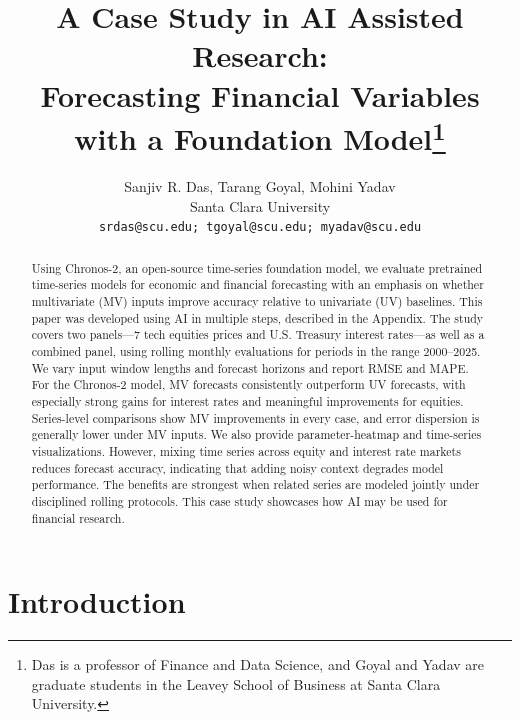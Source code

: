 \documentclass[twocolumn]{article}
\begin{document}
\title{A Case Study in AI Assisted Research: \\ Forecasting Financial Variables with a Foundation Model\thanks{Das is a professor of Finance and Data Science, and Goyal and Yadav are graduate students in the Leavey School of Business at Santa Clara University.}}
\author{Sanjiv R. Das, Tarang Goyal, Mohini Yadav \\ Santa Clara University\\ \texttt{srdas@scu.edu; tgoyal@scu.edu; myadav@scu.edu}}


\maketitle


\begin{abstract}
Using Chronos-2, an open-source time-series foundation model, we evaluate pretrained time-series models for economic and financial forecasting with an emphasis on whether multivariate (MV) inputs improve accuracy relative to univariate (UV) baselines. This paper was developed using AI in multiple steps, described in the Appendix. The study covers two panels---7 tech equities prices and U.S. Treasury interest rates---as well as a combined panel, using rolling monthly evaluations for periods in the range 2000--2025. We vary input window lengths and forecast horizons and report RMSE and MAPE. For the Chronos-2 model, MV forecasts consistently outperform UV forecasts, with especially strong gains for interest rates and meaningful improvements for equities. Series-level comparisons show MV improvements in every case, and error dispersion is generally lower under MV inputs. We also provide parameter-heatmap and time-series visualizations. However, mixing time series across equity and interest rate markets reduces forecast accuracy, indicating that adding noisy context degrades model performance. The benefits are strongest when related series are modeled jointly under disciplined rolling protocols. This case study showcases how AI may be used for financial research. 
\end{abstract}


\section{Introduction}
\end{document}
